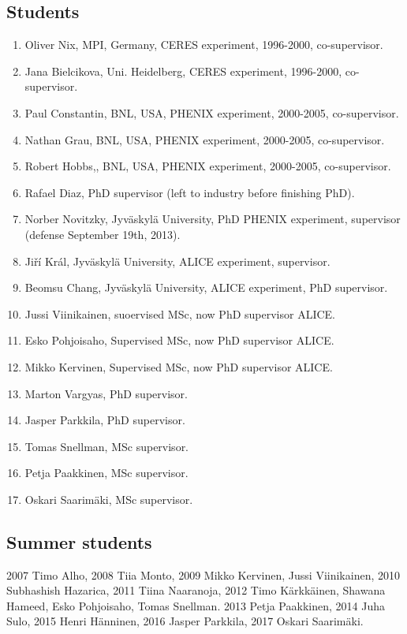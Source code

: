 \documentclass[12pt]{article}
\begin{document}
\subsection{Students}
\begin{enumerate}
\item Oliver Nix, MPI, Germany, CERES experiment, 1996-2000, co-supervisor.
\item Jana Bielcikova, Uni. Heidelberg, CERES experiment, 1996-2000, co-supervisor.
\item Paul Constantin, BNL, USA, PHENIX experiment, 2000-2005, co-supervisor.
\item Nathan Grau, BNL, USA, PHENIX experiment, 2000-2005, co-supervisor.
\item Robert Hobbs,, BNL, USA, PHENIX experiment, 2000-2005, co-supervisor.
\item Rafael Diaz, PhD supervisor (left to industry before finishing PhD).
\item Norber Novitzky, Jyv\"askyl\"a University, PhD PHENIX experiment, supervisor (defense September 19th, 2013).
\item Ji\v{r}\'i Kr\'al, Jyv\"askyl\"a University, ALICE experiment, supervisor.
\item Beomsu Chang, Jyv\"askyl\"a University, ALICE experiment, PhD supervisor.
\item Jussi Viinikainen, suoervised MSc, now PhD supervisor ALICE.
\item Esko Pohjoisaho, Supervised MSc, now PhD supervisor ALICE.
\item Mikko Kervinen, Supervised MSc, now PhD supervisor ALICE.
\item Marton Vargyas, PhD supervisor.
\item Jasper Parkkila, PhD supervisor.
\item Tomas Snellman, MSc supervisor.
\item Petja Paakkinen, MSc supervisor.
\item Oskari Saarim\"aki, MSc supervisor.
\end{enumerate}

\subsection{Summer students}
2007 Timo Alho, 2008 Tiia Monto, 2009 Mikko Kervinen, Jussi Viinikainen, 2010 Subhashish Hazarica, 2011 Tiina Naaranoja, 2012	 Timo K\"arkk\"ainen, Shawana Hameed, Esko Pohjoisaho, Tomas Snellman. 2013 Petja Paakkinen,
2014 Juha Sulo, 2015 Henri H\"anninen, 2016 Jasper Parkkila,
2017 Oskari Saarim\"aki.
\end{document}
